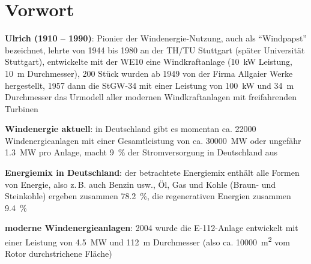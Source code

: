 \chapter{%
    Vorwort%
}

\textbf{Ulrich  (1910 -- 1990)}:
Pionier der Windenergie-Nutzung,
auch als "`Windpapst"' bezeichnet,
lehrte von 1944 bis 1980 an der TH/TU Stuttgart (später Universität Stuttgart),
entwickelte mit der WE10 eine Windkraftanlage
(\SI{10}{\kilo\watt} Leistung, \SI{10}{\meter} Durchmesser),
200 Stück wurden ab 1949 von der Firma Allgaier Werke hergestellt,
1957 dann die StGW-34 mit einer Leistung von \SI{100}{\kilo\watt}
und \SI{34}{\meter} Durchmesser
das Urmodell aller modernen Windkraftanlagen mit freifahrenden Turbinen

\textbf{Windenergie aktuell}:
in Deutschland gibt es momentan ca. \num{22000} Windenergieanlagen mit einer Gesamtleistung von
ca. \SI{30000}{\mega\watt} oder ungefähr \SI{1.3}{\mega\watt} pro Anlage,
macht \SI{9}{\percent} der Stromversorgung in Deutschland aus

\textbf{Energiemix in Deutschland}:
der betrachtete Energiemix enthält alle Formen von Energie, also z.\,B. auch Benzin usw.,
Öl, Gas und Kohle (Braun- und Steinkohle) ergeben zusammen \SI{78.2}{\percent},
die regenerativen Energien zusammen \SI{9.4}{\percent}

\textbf{moderne Windenergieanlagen}:
2004 wurde die E-112-Anlage entwickelt mit einer Leistung von \SI{4.5}{\mega\watt} und
\SI{112}{\meter} Durchmesser (also ca. \SI{10000}{\square\meter} vom Rotor durchstrichene Fläche)

\pagebreak
